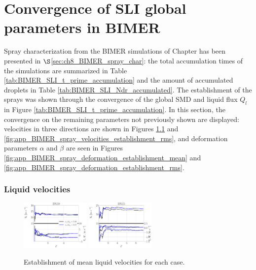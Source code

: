 \chapter{Convergence of SLI global parameters in BIMER}
\label{app:BIMER_SLI_convergence}

Spray characterization from the BIMER simulations of Chapter has been presented in $\S$\ref{sec:ch8_BIMER_spray_char}: the total accumulation times of the simulations are summarized in Table \ref{tab:BIMER_SLI_t_prime_accumulation} and the amount of accumulated droplets in Table \ref{tab:BIMER_SLI_Ndr_accumulated}. The establishment of the sprays was shown through the convergence of the global SMD and liquid flux $Q_l$ in Figure \ref{tab:BIMER_SLI_t_prime_accumulation}. In this section, the convergence on the remaining parameters not previously shown are displayed: velocities in three directions are shown in Figures \ref{fig:app_BIMER_spray_velocities_establishment_mean} and \ref{fig:app_BIMER_spray_velocities_establishment_rms}, and deformation parameters $\alpha$ and $\beta$ are seen in Figures \ref{fig:app_BIMER_spray_deformation_establishment_mean} and \ref{fig:app_BIMER_spray_deformation_establishment_rms}.



\subsection*{Liquid velocities}

\begin{figure}[ht]
	\centering
   \includegraphics[width=0.3\textwidth]{./part3_applications/figures_ch8_resolved/SPRAY_characterization/velocities/establishment_DX10_mean}
   \includegraphics[width=0.3\textwidth]{./part3_applications/figures_ch8_resolved/SPRAY_characterization/velocities/establishment_DX15_mean}
   \caption{Establishment of mean liquid velocities for each case.}
\label{fig:app_BIMER_spray_velocities_establishment_mean}
\end{figure}

